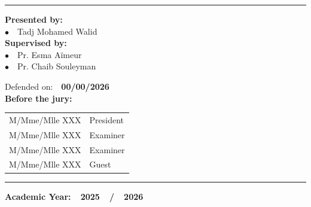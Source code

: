 \documentclass[a4paper,12pt]{article}
\begin{document}
\begin{center}
\vspace{0.3cm}
\noindent\textcolor{esiblue}{\rule{\linewidth}{0.8pt}}
\vspace{0.35cm}

\begin{minipage}[t]{0.46\textwidth}
  \raggedright
  {\Large\textbf{Presented by:}}\\[8pt]
  \hspace{1em}$\bullet$~~{\Large Tadj Mohamed Walid}\\[12pt]
  {\Large\textbf{Supervised by:}}\\[8pt]
  \hspace{1em}$\bullet$~~{\Large Pr. Esma Aïmeur}\\[5pt]
  \hspace{1em}$\bullet$~~{\Large Pr. Chaib Souleyman}
\end{minipage}%
\hfill
\begin{minipage}[t]{0.50\textwidth}
  \raggedright
  {\Large Defended on:~~\textbf{00/00/2026}}\\[9pt]
  {\Large\textbf{Before the jury:}}\\[6pt]
  \begin{tabular}{@{}ll@{}}
    {\Large M/Mme/Mlle XXX} & {\Large President}   \\[5pt]
    {\Large M/Mme/Mlle XXX} & {\Large Examiner}    \\[5pt]
    {\Large M/Mme/Mlle XXX} & {\Large Examiner}    \\[5pt]
    {\Large M/Mme/Mlle XXX} & {\Large Guest}       \\
  \end{tabular}
\end{minipage}

\vspace{0.35cm}
\noindent\textcolor{esiblue}{\rule{\linewidth}{1.5pt}}
\vspace{0.2cm}

{\Large\textbf{Academic Year:~~2025~~/~~2026}}

\end{center}
\end{document}
